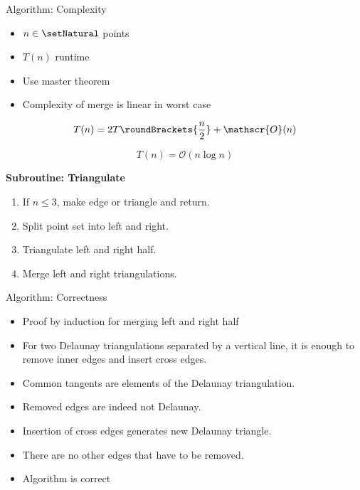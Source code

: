 \documentclass[aspectratio=169,fleqn]{beamer}
\begin{document}
  \begin{frame}{Algorithm: Complexity}
    \onslide<+->
    \begin{minipage}[c]{0.4\textwidth}
      \begin{itemize}
        \item<+-> $n\in\setNatural$ points
        \item<+-> $T(n)$ runtime
        \item<+-> Use master theorem
        \item<+-> Complexity of merge is linear in worst case
      \end{itemize}
      \medskip
      \onslide<+->
      \[
        T(n) = 2 T\roundBrackets{\frac{n}{2}} + \mathscr{O}(n)
      \]
      \onslide<+->
      \begin{mybox}
        \[
          T(n) = \mathscr{O}(n\log n)
        \]
      \end{mybox}
    \end{minipage}
    \hfill
    \begin{minipage}[c]{0.49\textwidth}
      \begin{mybox}
        \textbf{Subroutine: Triangulate}
        \begin{enumerate}
          \item If $n\leq 3$, make edge or triangle and return.
          \item Split point set into left and right.
          \item Triangulate left and right half.
          \item Merge left and right triangulations.
        \end{enumerate}
      \end{mybox}%
    \end{minipage}
  \end{frame}

  \begin{frame}{Algorithm: Correctness}
    \onslide<+->
    \begin{itemize}
      \item<+-> Proof by induction for merging left and right half
      \item<+-> For two Delaunay triangulations separated by a vertical line, it is enough to remove inner edges and insert cross edges.
      \item<+-> Common tangents are elements of the Delaunay triangulation.
      \item<+-> Removed edges are indeed not Delaunay.
      \item<+-> Insertion of cross edges generates new Delaunay triangle.
      \item<+-> There are no other edges that have to be removed.
      \item<+-> Algorithm is correct
    \end{itemize}
  \end{frame}
\end{document}

